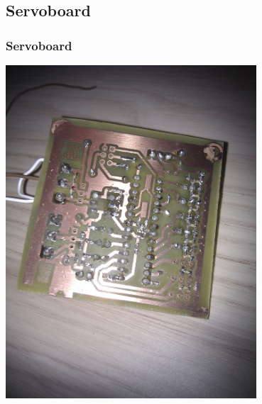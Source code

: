 \documentclass[pdf]{beamer}
\begin{document}
\subsection{Servoboard}

\begin{frame}
\frametitle{Servoboard}
  \begin{center}
  \includegraphics[width = 0.7\textwidth]{pics/raw/servoboard_rueckseite.jpg}
  \end{center}
\end{frame}
\end{document}

